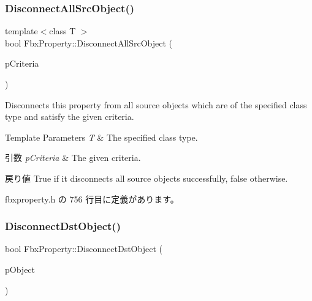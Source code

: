 \subsubsection{\texorpdfstring{Disconnect\+All\+Src\+Object()}{DisconnectAllSrcObject()}\hspace{0.1cm}{\footnotesize\ttfamily [4/4]}}
{\footnotesize\ttfamily template$<$class T $>$ \\
bool Fbx\+Property\+::\+Disconnect\+All\+Src\+Object (\begin{DoxyParamCaption}\item[{const \hyperlink{class_fbx_criteria}{Fbx\+Criteria} \&}]{p\+Criteria }\end{DoxyParamCaption})\hspace{0.3cm}{\ttfamily [inline]}}

Disconnects this property from all source objects which are of the specified class type and satisfy the given criteria. 
\begin{DoxyTemplParams}{Template Parameters}
{\em T} & The specified class type. \\
\hline
\end{DoxyTemplParams}

\begin{DoxyParams}{引数}
{\em p\+Criteria} & The given criteria. \\
\hline
\end{DoxyParams}
\begin{DoxyReturn}{戻り値}
{\ttfamily True} if it disconnects all source objects successfully, {\ttfamily false} otherwise. 
\end{DoxyReturn}


 fbxproperty.\+h の 756 行目に定義があります。

\mbox{\label{class_fbx_property_a322bdde93bd6716cdeeddd29d735d900}} 
\subsubsection{\texorpdfstring{Disconnect\+Dst\+Object()}{DisconnectDstObject()}}
{\footnotesize\ttfamily bool Fbx\+Property\+::\+Disconnect\+Dst\+Object (\begin{DoxyParamCaption}\item[{\hyperlink{class_fbx_object}{Fbx\+Object} $\ast$}]{p\+Object }\end{DoxyParamCaption})}

